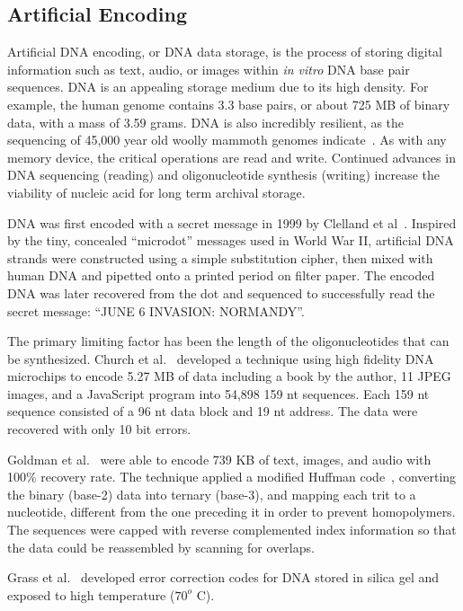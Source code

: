 \documentclass[USenglish,oneside,twocolumn]{article}
\begin{document}
\subsection{Artificial Encoding}

Artificial DNA encoding, or DNA data storage, is the process of storing digital information such as text, audio, or images within \textit{in vitro} DNA base pair sequences. DNA is an appealing storage medium due to its high density. For example, the human genome contains 3.3 base pairs, or about 725 MB of binary data, with a mass of 3.59 grams. DNA is also incredibly resilient, as the sequencing of 45,000 year old woolly mammoth genomes indicate~\cite{PALKOPOULOU2015}. As with any memory device, the critical operations are read and write. Continued advances in DNA sequencing (reading) and oligonucleotide synthesis (writing) increase the viability of nucleic acid for long term archival storage.

DNA was first encoded with a secret message in 1999 by Clelland et al~\cite{CRB1999N}. Inspired by the tiny, concealed “microdot” messages used in World War II, artificial DNA strands were constructed using a simple substitution cipher, then mixed with human DNA and pipetted onto a printed period on filter paper. The encoded DNA was later recovered from the dot and sequenced to successfully read the secret message: “JUNE 6 INVASION: NORMANDY”.

The primary limiting factor has been the length of the oligonucleotides that can be synthesized. Church et al.~\cite{CHURCH2012} developed a technique using high fidelity DNA microchips to encode 5.27 MB of data including a book by the author, 11 JPEG images, and a JavaScript program into 54,898 159 nt sequences. Each 159 nt sequence consisted of a 96 nt data block and 19 nt address. The data were recovered with only 10 bit errors.

Goldman et al.~\cite{GOLDMAN2013} were able to encode 739 KB of text, images, and audio with 100\% recovery rate. The technique applied a modified Huffman code~\cite{H1952POTIRE}, converting the binary (base-2) data into ternary (base-3), and mapping each trit to a nucleotide, different from the one preceding it in order to prevent homopolymers. The sequences were capped with reverse complemented index information so that the data could be reassembled by scanning for overlaps.

Grass et al.~\cite{GRASS2015} developed error correction codes for DNA stored in silica gel and exposed to high temperature ($70^o$ C).
\end{document}
